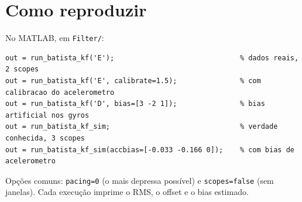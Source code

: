 \documentclass[10pt,a4paper]{article}
\newcommand{\code}[1]{\texttt{#1}}
\begin{document}
\section{Como reproduzir}\label{sec:repro}

No MATLAB, em \code{Filter/}:

\begin{verbatim}
out = run_batista_kf('E');                              % dados reais, 2 scopes
out = run_batista_kf('E', calibrate=1.5);               % com calibracao do acelerometro
out = run_batista_kf('D', bias=[3 -2 1]);               % bias artificial nos gyros
out = run_batista_kf_sim;                               % verdade conhecida, 3 scopes
out = run_batista_kf_sim(accbias=[-0.033 -0.166 0]);    % com bias de acelerometro
\end{verbatim}

Op\c{c}\~oes comuns: \code{pacing=0} (o mais depressa poss\'ivel) e \code{scopes=false} (sem janelas).
Cada execu\c{c}\~ao imprime o RMS, o offset e o bias estimado.
\end{document}
